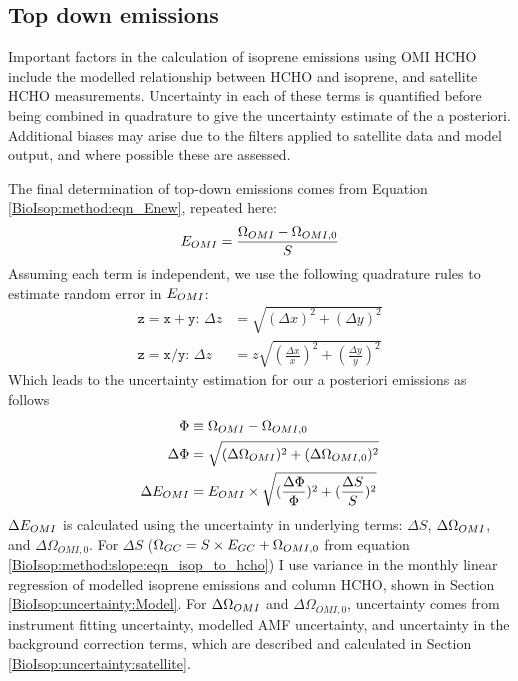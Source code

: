   \subsection{Top down emissions}
    \label{BioIsop:uncertainty:eomi}
    
    Important factors in the calculation of isoprene emissions using OMI HCHO include the modelled relationship between HCHO and isoprene, and satellite HCHO measurements.
    Uncertainty in each of these terms is quantified before being combined in quadrature to give the uncertainty estimate of the a posteriori.
    Additional biases may arise due to the filters applied to satellite data and model output, and where possible these are assessed. 
    
    The final determination of top-down emissions comes from Equation \ref{BioIsop:method:eqn_Enew}, repeated here: 
    \begin{equation*}
      E_{OMI}=\frac{\Omega_{OMI} - \Omega_{OMI,0}}{S}
    \end{equation*}
    Assuming each term is independent, we use the following quadrature rules to estimate random error in $E_{OMI}$:
    \begin{align}
      \mathtt{z=x+y:} \, \Delta{z} & = \sqrt{(\Delta{x})^2 + (\Delta{y})^2} \label{BioIsop:uncertainty:eqn_quadrature_add} \\
      \mathtt{z=x/y:} \, \Delta{z} & = z \sqrt{(\frac{\Delta{x}}{x})^2 + (\frac{\Delta{y}}{y})^2} \label{BioIsop:uncertainty:eqn_quadrature_divide} 
    \end{align}
    Which leads to the uncertainty estimation for our a posteriori emissions as follows
    \begin{align}
      \Phi & \equiv \Omega_{OMI} - \Omega_{OMI,0}   \notag \\
      \Delta{\Phi} & = \sqrt{(\Delta{\Omega_{OMI}})^2 + (\Delta{\Omega_{OMI,0}})^2}  \label{BioIsop:uncertainty:eomi:eqn_delta_Phi} \\
      \Delta{E_{OMI}} &= E_{OMI} \times \sqrt{(\frac{\Delta{\Phi}}{\Phi})^2 + (\frac{\Delta{S}}{S})^2} \label{BioIsop:uncertainty:eomi:eqn_delta_apost}
    \end{align}
    $\Delta{E_{OMI}}$ is calculated using the uncertainty in underlying terms: $\Delta{S}$, $\Delta{\Omega_{OMI}}$, and $\Delta{\Omega_{OMI,0}}$. 
    For $\Delta{S}$ ($\Omega_{GC} = S \times E_{GC} + \Omega_{OMI,0}$ from equation \ref{BioIsop:method:slope:eqn_isop_to_hcho}) I use variance in the monthly linear regression of modelled isoprene emissions and column HCHO, shown in Section \ref{BioIsop:uncertainty:Model}.
    For $\Delta \Omega_{OMI}$ and $\Delta \Omega_{OMI,0}$, uncertainty comes from instrument fitting uncertainty, modelled AMF uncertainty, and uncertainty in the background correction terms, which are described and calculated in Section \ref{BioIsop:uncertainty:satellite}.
    
